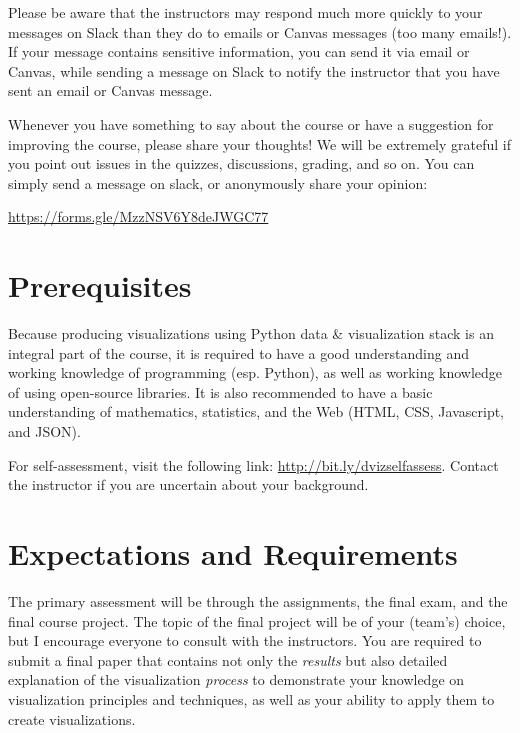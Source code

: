 \documentclass[11pt,article,oneside]{memoir} %
\begin{document}
Please be aware that the instructors may respond much more quickly to your messages on Slack than they do to emails or Canvas messages (too many emails!). If your message contains sensitive information, you can send it via email or Canvas, while sending a message on Slack to notify the instructor that you have sent an email or Canvas message. 

Whenever you have something to say about the course or have a suggestion for improving the course, please share your thoughts! We will be extremely grateful if you point out issues in the quizzes, discussions, grading, and so on. You can simply send a message on slack, or anonymously share your opinion:

\url{https://forms.gle/MzzNSV6Y8deJWGC77} 

\section{Prerequisites}%
\label{sec:Prerequisites}

Because producing visualizations using Python data \& visualization stack is an integral part of the course, it is required to have a good understanding and working knowledge of programming (esp. Python), as well as working knowledge of using open-source libraries. 
It is also recommended to have a basic understanding of mathematics, statistics, and the Web (HTML, CSS, Javascript, and JSON). 

For self-assessment, visit the following link: \href{http://bit.ly/dvizselfassess}{http://bit.ly/dvizselfassess}. 
Contact the instructor if you are uncertain about your background. 

\section{Expectations and Requirements}%
\label{sec:requirements}

The primary assessment will be through the assignments, the final exam, and the final course project. 
The topic of the final project will be of your (team's) choice, but I encourage everyone to consult with the instructors. 
You are required to submit a final paper that contains not only the \emph{results} but also detailed explanation of the visualization \emph{process} to demonstrate your knowledge on visualization principles and techniques, as well as your ability to apply them to create visualizations. 
\end{document}
